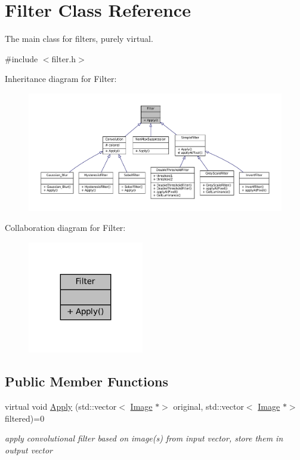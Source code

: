 \hypertarget{classFilter}{}\section{Filter Class Reference}
\label{classFilter}


The main class for filters, purely virtual.  




{\ttfamily \#include $<$filter.\+h$>$}



Inheritance diagram for Filter\+:
\nopagebreak
\begin{figure}[H]
\begin{center}
\leavevmode
\includegraphics[width=350pt]{classFilter__inherit__graph}
\end{center}
\end{figure}


Collaboration diagram for Filter\+:
\nopagebreak
\begin{figure}[H]
\begin{center}
\leavevmode
\includegraphics[width=143pt]{classFilter__coll__graph}
\end{center}
\end{figure}
\subsection*{Public Member Functions}
\begin{DoxyCompactItemize}
\item 
virtual void \hyperlink{classFilter_afab0d50af44a19a370ebe46c69b8ff4e}{Apply} (std\+::vector$<$ \hyperlink{classImage}{Image} $\ast$$>$ original, std\+::vector$<$ \hyperlink{classImage}{Image} $\ast$$>$ filtered)=0
\begin{DoxyCompactList}\small\item\em apply convolutional filter based on image(s) from input vector, store them in output vector \end{DoxyCompactList}\end{DoxyCompactItemize}


